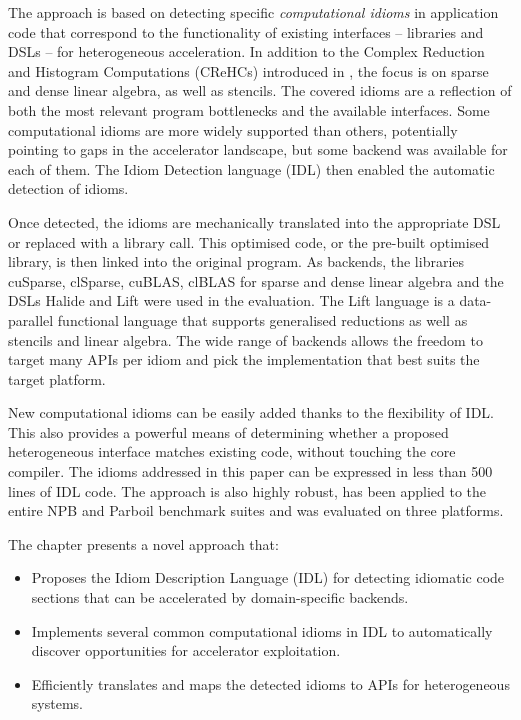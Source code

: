     The approach is based on detecting specific {\em computational idioms} in
    application code that correspond to the functionality of existing interfaces
    -- libraries and DSLs -- for heterogeneous acceleration.
    In addition to the Complex Reduction and Histogram Computations (CReHCs)
    introduced in , the focus is on
    sparse and dense linear algebra, as well as stencils.
    The covered idioms are a reflection of both the most relevant program
    bottlenecks and the available interfaces.
    Some computational idioms are more widely supported than others, potentially
    pointing to gaps in the accelerator landscape, but some backend was
    available for each of them.
    The Idiom Detection language (IDL) then enabled the automatic detection of
    idioms.

    Once detected, the idioms are mechanically translated into the appropriate
    DSL or replaced with a library call.
    This optimised code, or the pre-built optimised library, is then linked into
    the original program.
    As backends, the libraries cuSparse, clSparse, cuBLAS, clBLAS for
    sparse and dense linear algebra and the DSLs Halide
    \cite{Ragan-Kelley2013Halide} and Lift \cite{SteuwerRD17} were used in the
    evaluation.
    The Lift language is a data-parallel functional language that supports
    generalised reductions as well as stencils and linear algebra.
    The wide range of backends allows the freedom to target many APIs per idiom
    and pick the implementation that best suits the target platform.

    New computational idioms can be easily added thanks to the flexibility of IDL.
    This also provides a powerful means of determining whether a proposed
    heterogeneous interface matches existing code, without touching the core
    compiler.
    The idioms addressed in this paper can be expressed in less than 500 lines
    of IDL code.
    The approach is also highly robust, has been applied to the entire NPB
    and Parboil benchmark suites and was evaluated on three platforms.

    The chapter presents a novel approach that:
    \begin{itemize}
    \item Proposes the Idiom Description Language (IDL) for detecting idiomatic
          code sections that can be accelerated by domain-specific backends.
    \item Implements several common computational idioms in IDL to automatically
          discover opportunities for accelerator exploitation.
    \item Efficiently translates and maps the detected idioms to APIs for
          heterogeneous systems.
    \end{itemize}

